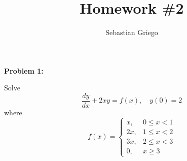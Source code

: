 \documentclass[12pt]{article}
\newenvironment{problem}[1]{
    \textbf{Problem #1:}
}{
    \rmfamily \vspace{1em}
}
\begin{document}
\title{Homework \#2}  %
\author{Sebastian Griego}  %
\maketitle

\begin{problem}{1}
Solve
    \[
        \frac{dy}{dx} + 2xy = f(x), \quad y(0) = 2
    \]
    where
    \[
        f(x) = \begin{cases}
            x, & 0 \leq x < 1 \\
            2x, & 1 \leq x < 2 \\
            3x, & 2 \leq x < 3 \\
            0, & x \geq 3
        \end{cases}
    \]
\end{problem}
\end{document}

